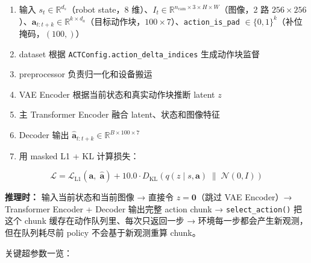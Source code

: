 \documentclass[
  chinese,
]{ctexart}
\providecommand{\tightlist}{%
  \setlength{\itemsep}{0pt}\setlength{\parskip}{0pt}}
\begin{document}
\begin{enumerate}
\def\labelenumi{\arabic{enumi}.}
\tightlist
\item
  输入 \(s_t \in \mathbb{R}^{d_s}\)（robot state，8
  维）、\(I_t \in \mathbb{R}^{n_{\text{cam}} \times 3 \times H \times W}\)（图像，2
  路
  \(256 \times 256\)）、\(\mathbf{a}_{t:t+k} \in \mathbb{R}^{k \times d_a}\)（目标动作块，\(100 \times 7\)）、\texttt{action\_is\_pad}
  \(\in \{0,1\}^{k}\)（补位掩码，\((100,)\)）
\item
  dataset 根据 \texttt{ACTConfig.action\_delta\_indices} 生成动作块监督
\item
  preprocessor 负责归一化和设备搬运
\item
  VAE Encoder 根据当前状态和真实动作块推断 latent \(z\)
\item
  主 Transformer Encoder 融合 latent、状态和图像特征
\item
  Decoder 输出
  \(\hat{\mathbf{a}}_{t:t+k} \in \mathbb{R}^{B \times 100 \times 7}\)
\item
  用 masked L1 + KL 计算损失：
\end{enumerate}

\[
\mathcal{L} = \mathcal{L}_{\text{L1}}(\mathbf{a},\; \hat{\mathbf{a}}) + 10.0 \cdot D_{\text{KL}}\!\left(q(z \mid s, \mathbf{a}) \;\|\; \mathcal{N}(0, I)\right)
\]

\textbf{推理时：} 输入当前状态和当前图像 → 直接令
\(z = \mathbf{0}\)（跳过 VAE Encoder）→ Transformer Encoder + Decoder
输出完整 action chunk → \texttt{select\_action()} 把这个 chunk
缓存在动作队列里、每次只返回一步 →
环境每一步都会产生新观测，但在队列耗尽前 policy 不会基于新观测重算
chunk。

关键超参数一览：
\end{document}
